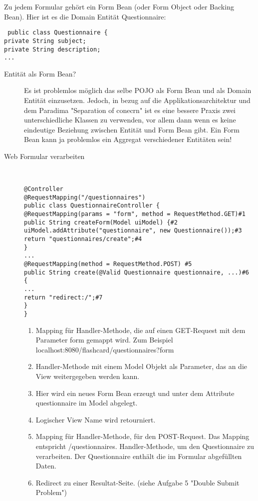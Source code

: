 \documentclass[a4paper,10pt]{scrreprt}
\begin{document}
{Zu jedem Formular gehört ein Form Bean (oder Form Object oder Backing Bean). Hier ist es die
Domain Entität Questionnaire:
\begin{verbatim}
 public class Questionnaire {
private String subject;
private String description;
...
\end{verbatim}

\begin{description}
 \item [Entität als Form Bean?] Es ist problemlos möglich das selbe POJO als Form Bean und als Domain Entität 
einzusetzen. Jedoch, in
bezug auf die Applikationsarchitektur und dem Paradima "Separation of conecrn" ist es eine bessere
Praxis zwei unterschiedliche Klassen zu verwenden, vor allem dann wenn es keine eindeutige Beziehung
zwischen Entität und Form Bean gibt. Ein Form Bean kann ja problemlos ein Aggregat verschiedener
Entitäten sein!

\item[Web Formular verarbeiten] \hfill \\
\begin{lstlisting}[caption=Web Formular verarbeiten Spring]
@Controller
@RequestMapping("/questionnaires")
public class QuestionnaireController {
@RequestMapping(params = "form", method = RequestMethod.GET)#1
public String createForm(Model uiModel) {#2
uiModel.addAttribute("questionnaire", new Questionnaire());#3
return "questionnaires/create";#4
}
...
@RequestMapping(method = RequestMethod.POST) #5
public String create(@Valid Questionnaire questionnaire, ...)#6 {
...
return "redirect:/";#7
}
}
\end{lstlisting}
\begin{enumerate}
 \item Mapping für Handler-Methode, die auf einen GET-Request mit dem Parameter form gemappt
wird. Zum Beispiel localhost:8080/flashcard/questionnaires?form
\item Handler-Methode mit einem Model Objekt als Parameter, das an die View weitergegeben
werden kann.
\item Hier wird ein neues Form Bean erzeugt und unter dem Attribute questionnaire im Model
abgelegt.
\item Logischer View Name wird retourniert.
\item Mapping für Handler-Methode, für den POST-Request. Das Mapping entspricht
/questionnaires.
Handler-Methode, um den Questionnaire zu verarbeiten. Der Questionnaire enthält die
im Formular abgefüllten Daten.
\item Redirect zu einer Resultat-Seite. (siehe Aufgabe 5 "Double Submit Problem")
\end{enumerate}	


\end{description}}
\end{document}
